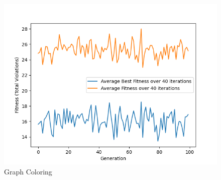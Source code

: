 \documentclass[11pt, letterpaper]{article}
\begin{document}
\begin{figure}[H]
  \includegraphics[width=\linewidth]{images/graphcoloring_rd_rd.png}
  \caption{Graph Coloring}
\endminipage
\end{figure}
\end{document}
